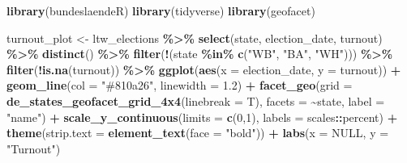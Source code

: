 \documentclass[
]{scrartcl}
\newenvironment{Shaded}{\begin{snugshade}}{\end{snugshade}}
\newcommand{\AttributeTok}[1]{\textcolor[rgb]{0.13,0.29,0.53}{#1}}
\newcommand{\ConstantTok}[1]{\textcolor[rgb]{0.56,0.35,0.01}{#1}}
\newcommand{\DecValTok}[1]{\textcolor[rgb]{0.00,0.00,0.81}{#1}}
\newcommand{\FloatTok}[1]{\textcolor[rgb]{0.00,0.00,0.81}{#1}}
\newcommand{\FunctionTok}[1]{\textcolor[rgb]{0.13,0.29,0.53}{\textbf{#1}}}
\newcommand{\NormalTok}[1]{#1}
\newcommand{\OtherTok}[1]{\textcolor[rgb]{0.56,0.35,0.01}{#1}}
\newcommand{\SpecialCharTok}[1]{\textcolor[rgb]{0.81,0.36,0.00}{\textbf{#1}}}
\newcommand{\StringTok}[1]{\textcolor[rgb]{0.31,0.60,0.02}{#1}}
\begin{document}
\begin{Shaded}
\begin{Highlighting}[]
\FunctionTok{library}\NormalTok{(bundeslaendeR)}
\FunctionTok{library}\NormalTok{(tidyverse)}
\FunctionTok{library}\NormalTok{(geofacet)}

\NormalTok{turnout\_plot }\OtherTok{\textless{}{-}}
\NormalTok{ltw\_elections }\SpecialCharTok{\%\textgreater{}\%} 
  \FunctionTok{select}\NormalTok{(state, election\_date, turnout) }\SpecialCharTok{\%\textgreater{}\%} 
  \FunctionTok{distinct}\NormalTok{() }\SpecialCharTok{\%\textgreater{}\%} 
  \FunctionTok{filter}\NormalTok{(}\SpecialCharTok{!}\NormalTok{(state }\SpecialCharTok{\%in\%} \FunctionTok{c}\NormalTok{(}\StringTok{"WB"}\NormalTok{, }\StringTok{"BA"}\NormalTok{, }\StringTok{"WH"}\NormalTok{))) }\SpecialCharTok{\%\textgreater{}\%} 
  \FunctionTok{filter}\NormalTok{(}\SpecialCharTok{!}\FunctionTok{is.na}\NormalTok{(turnout)) }\SpecialCharTok{\%\textgreater{}\%} 
  \FunctionTok{ggplot}\NormalTok{(}\FunctionTok{aes}\NormalTok{(}\AttributeTok{x =}\NormalTok{ election\_date, }\AttributeTok{y =}\NormalTok{ turnout)) }\SpecialCharTok{+}
    \FunctionTok{geom\_line}\NormalTok{(}\AttributeTok{col =} \StringTok{"\#810a26"}\NormalTok{, }\AttributeTok{linewidth =} \FloatTok{1.2}\NormalTok{) }\SpecialCharTok{+}
    \FunctionTok{facet\_geo}\NormalTok{(}\AttributeTok{grid =} \FunctionTok{de\_states\_geofacet\_grid\_4x4}\NormalTok{(}\AttributeTok{linebreak =}\NormalTok{ T),}
              \AttributeTok{facets =} \SpecialCharTok{\textasciitilde{}}\NormalTok{state, }\AttributeTok{label =} \StringTok{"name"}\NormalTok{) }\SpecialCharTok{+}
    \FunctionTok{scale\_y\_continuous}\NormalTok{(}\AttributeTok{limits =} \FunctionTok{c}\NormalTok{(}\DecValTok{0}\NormalTok{,}\DecValTok{1}\NormalTok{),}
                       \AttributeTok{labels =}\NormalTok{ scales}\SpecialCharTok{::}\NormalTok{percent) }\SpecialCharTok{+}
    \FunctionTok{theme}\NormalTok{(}\AttributeTok{strip.text =} \FunctionTok{element\_text}\NormalTok{(}\AttributeTok{face =} \StringTok{"bold"}\NormalTok{)) }\SpecialCharTok{+}
    \FunctionTok{labs}\NormalTok{(}\AttributeTok{x =} \ConstantTok{NULL}\NormalTok{, }\AttributeTok{y =} \StringTok{"Turnout"}\NormalTok{)}
\end{Highlighting}
\end{Shaded}

\nocite{runfolaGeoBoundariesGlobalDatabase2020}

\newpage
\end{document}
